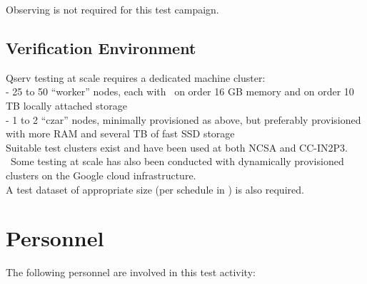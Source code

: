 \documentclass[DM,lsstdraft,STR,toc]{lsstdoc}
\begin{document}
  Observing is not required for this test campaign.

\subsection{Verification Environment}
\label{sect:hwconf}
  Qserv testing at scale requires a dedicated machine
cluster:\\[2\baselineskip]- 25 to 50 ``worker'' nodes, each with ~on
order 16 GB memory and on order 10 TB locally attached storage\\
- 1 to 2 ``czar'' nodes, minimally provisioned as above, but preferably
provisioned with more RAM and several TB of fast SSD
storage\\[2\baselineskip]Suitable test clusters exist and have been used
at both NCSA and CC-IN2P3. ~Some testing at scale has also been
conducted with dynamically provisioned clusters on the Google cloud
infrastructure.\\[2\baselineskip]A test dataset of appropriate size (per
schedule in ) is also required.





\section{Personnel}
\label{sect:personnel}

The following personnel are involved in this test activity:
\end{document}
